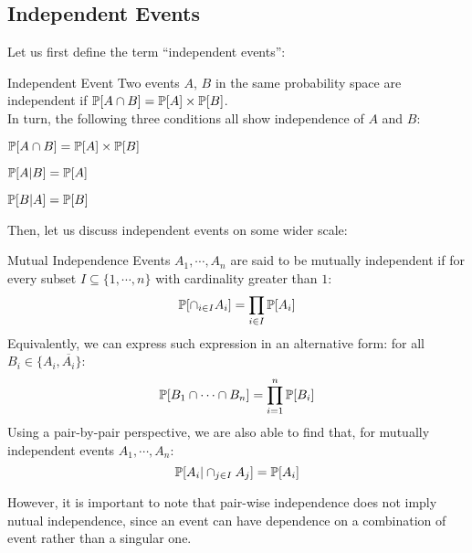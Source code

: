 \subsection{Independent Events}
Let us first define the term ``independent events'':
\begin{ln-define}{Independent Event}{}
    Two events $A$, $B$ in the same probability space are independent if $\P[A \cap B] = \P[A] \times \P[B]$. \\
    In turn, the following three conditions all show independence of $A$ and $B$:
    \begin{bindenum}
        \item $\P[A \cap B] = \P[A] \times \P[B]$
        \item $\P[A|B] = \P[A]$
        \item $\P[B|A] = \P[B]$
    \end{bindenum}
\end{ln-define}

Then, let us discuss independent events on some wider scale:
\begin{ln-define}{Mutual Independence}{}
    Events $A_1, \cdots, A_n$ are said to be mutually independent if for every subset $I \subseteq \{1, \cdots, n\}$ with cardinality greater than $1$:
    \[\P[\cap_{i \in I} A_i] = \prod_{i \in I} \P[A_i]\]
    Equivalently, we can express such expression in an alternative form: for all $B_i \in \{A_i, \overline{A_i}\}$:
    \[\P[B_1 \cap \cdots \cap B_n] = \prod_{i = 1}^n \P[B_i]\]
    Using a pair-by-pair perspective, we are also able to find that, for mutually independent events $A_1, \cdots, A_n$:
    \[\P[A_i | \cap_{j \in I} A_j] = \P[A_i]\]
\end{ln-define}
However, it is important to note that pair-wise independence does not imply nutual independence, since an event can have dependence on a combination of event rather than a singular one.

